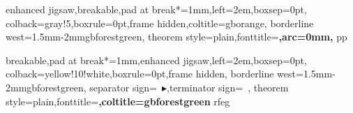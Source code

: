 \usepackage[listings,theorems,most]{tcolorbox}
\newcommand{\bibliofmt}[1]{\medskip\textcolor{gbforestgreen}{\heiti#1}}

{enhanced jigsaw,breakable,pad at break*=1mm,left=2em,boxsep=0pt,
 colback=gray!5,boxrule=0pt,frame hidden,coltitle=gborange,
 borderline west={1.5mm}{-2mm}{gbforestgreen},
 theorem style=plain,fonttitle=\bfseries\heiti,arc=0mm,
}{pp}

{breakable,pad at break*=1mm,enhanced jigsaw,left=2em,boxsep=0pt,
 colback=yellow!10!white,boxrule=0pt,frame hidden,
 borderline west={1.5mm}{-2mm}{gbforestgreen},
separator sign={\ $\blacktriangleright$},terminator sign={\ },
theorem style=plain,fonttitle=\bfseries\heiti,coltitle=gbforestgreen
}{rfeg}


\newcommand{\titleformanual}[1]{\def\biaotiudf{#1}}
\newcommand{\authorformanual}[1]{\def\zuozheudf{#1}}
\newcommand{\dateformanual}[1]{\def\riqiudf{#1}}
\def\temp{}
\makeatletter
\newcommand{\titleandauthor}{
\begin{center}
\def\@makefnmark{\hbox{\@textsuperscript{\small\@thefnmark}}}
{\setlength{\baselineskip}{40pt}\renewcommand{\thefootnote}{\fnsymbol{footnote}}
\heiti{\zihao{-2}{\biaotiudf}}\par}%
\setlength{\baselineskip}{0.1cm}
\rule{0pt}{0.5cm}\par
{\renewcommand{\thefootnote}{\arabic{footnote}}
\kaishu{\zihao{4}{\zuozheudf}}\par}
\rule{0pt}{0.3cm}\par
{\songti{\zihao{-4}{\riqiudf}}\par}
\end{center}
}
\makeatother


